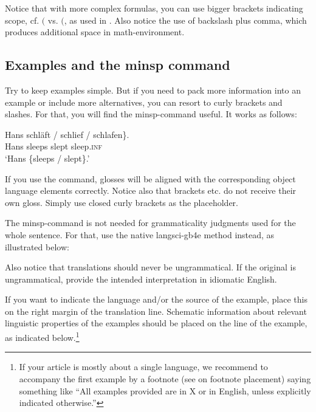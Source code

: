 \noindent Notice that with more complex formulas, you can use bigger brackets indicating scope, cf. $($ vs. $\big($, as used in . Also notice the use of backslash plus comma, which produces additional space in math-environment.

\subsection{Examples and the minsp command}

Try to keep examples simple. But if you need to pack more information into an example or include more alternatives, you can resort to curly brackets and slashes. For that, you will find the minsp-command useful. It works as follows:

\ea\label{sim:ex:german-verbs}\gll Hans \minsp{\{} schläft / schlief / \minsp{*} schlafen\}.\\
Hans {} sleeps {} slept {} {} sleep.\textsc{inf}\\
\glt `Hans \{sleeps / slept\}.'
\z

\noindent If you use the command, glosses will be aligned with the corresponding object language elements correctly. Notice also that brackets etc. do not receive their own gloss. Simply use closed curly brackets as the placeholder.

The minsp-command is not needed for grammaticality judgments used for the whole sentence. For that, use the native langsci-gb4e method instead, as illustrated below:

\z

\noindent Also notice that translations should never be ungrammatical. If the original is ungrammatical, provide the intended interpretation in idiomatic English.

If you want to indicate the language and/or the source of the example, place this on the right margin of the translation line. Schematic information about relevant linguistic properties of the examples should be placed on the line of the example, as indicated below.\footnote{If your article is mostly about a single language, we recommend to accompany the first example by a footnote (see  on footnote placement) saying something like ``All examples provided are in X or in English, unless explicitly indicated otherwise.''}


